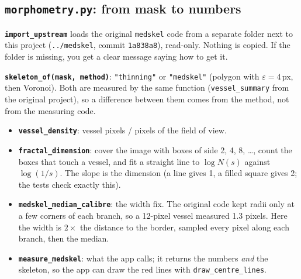 \subsection{\texttt{morphometry.py}: from mask to numbers}
\textbf{\texttt{import\_upstream}} loads the original \texttt{medskel} code from a separate folder next to this project (\texttt{../medskel}, commit \texttt{1a838a8}), read-only. Nothing is copied. If the folder is missing, you get a clear message saying how to get it.

\textbf{\texttt{skeleton\_of(mask, method)}}: \texttt{"thinning"} or \texttt{"medskel"} (polygon with $\varepsilon = 4$\,px, then Voronoi). Both are measured by the same function (\texttt{vessel\_summary} from the original project), so a difference between them comes from the method, not from the measuring code.

\begin{itemize}
  \item \textbf{\texttt{vessel\_density}}: vessel pixels / pixels of the field of view.
  \item \textbf{\texttt{fractal\_dimension}}: cover the image with boxes of side 2, 4, 8, \dots, count the boxes that touch a vessel, and fit a straight line to $\log N(s)$ against $\log(1/s)$. The slope is the dimension (a line gives 1, a filled square gives 2; the tests check exactly this).
  \item \textbf{\texttt{medskel\_median\_calibre}}: the width fix. The original code kept radii only at a few corners of each branch, so a 12-pixel vessel measured 1.3 pixels. Here the width is $2\times$ the distance to the border, sampled every pixel along each branch, then the median.
  \item \textbf{\texttt{measure\_medskel}}: what the app calls; it returns the numbers \emph{and} the skeleton, so the app can draw the red lines with \texttt{draw\_centre\_lines}.
\end{itemize}

